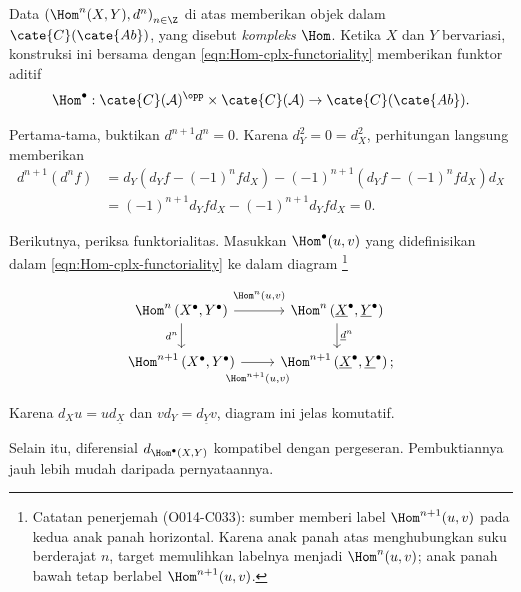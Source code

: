\begin{definisiproposisi}
	Data $\left(\Hom^n(X,Y),d^n\right)_{n\in\Z}$ di atas memberikan objek
	dalam $\cate{C}(\cate{Ab})$, yang disebut \emph{kompleks $\Hom$}. Ketika
	$X$ dan $Y$ bervariasi, konstruksi ini bersama
	dengan \eqref{eqn:Hom-cplx-functoriality} memberikan funktor aditif
	\[ \Hom^\bullet: \cate{C}(\mathcal{A})^{\opp} \times \cate{C}(\mathcal{A}) \to \cate{C}(\cate{Ab}). \]
\end{definisiproposisi}
\begin{bukti}
	Pertama-tama, buktikan $d^{n+1}d^n=0$. Karena
	$d_Y^2=0=d_X^2$, perhitungan langsung memberikan
	\begin{align*}
		d^{n+1} \left( d^n f \right) & = d_Y \left( d_Y f - (-1)^n f d_X \right) - (-1)^{n+1} \left( d_Y f - (-1)^n f d_X \right) d_X \\
		& = (-1)^{n+1} d_Y f d_X - (-1)^{n+1} d_Y f d_X = 0.
	\end{align*}

	Berikutnya, periksa funktorialitas. Masukkan $\Hom^\bullet(u,v)$ yang
	didefinisikan dalam \eqref{eqn:Hom-cplx-functoriality} ke dalam diagram%
	\footnote{Catatan penerjemah (O014-C033): sumber memberi label
	$\Hom^{n+1}(u,v)$ pada kedua anak panah horizontal. Karena anak panah atas
	menghubungkan suku berderajat $n$, target memulihkan labelnya menjadi
	$\Hom^n(u,v)$; anak panah bawah tetap berlabel $\Hom^{n+1}(u,v)$.}
	\[\begin{tikzcd}
		\Hom^n\left( X^\bullet, Y^\bullet \right) \arrow[d, "{d^n}"'] \arrow[r, "{\Hom^n(u, v)}" inner sep=0.7em] & \Hom^n\left( \underline{X}^\bullet, \underline{Y}^\bullet \right) \arrow[d, "{\underline{d}^n}"] \\
		\Hom^{n+1}\left( X^\bullet, Y^\bullet \right) \arrow[r, "{\Hom^{n+1}(u, v)}"' inner sep=0.7em] & \Hom^{n+1}\left( \underline{X}^\bullet, \underline{Y}^\bullet \right) ;
	\end{tikzcd}\]
	Karena $d_Xu=ud_{\underline{X}}$ dan $vd_Y=d_{\underline{Y}}v$, diagram
	ini jelas komutatif.
\end{bukti}

Selain itu, diferensial $d_{\Hom^\bullet(X,Y)}$ kompatibel dengan pergeseran.
Pembuktiannya jauh lebih mudah daripada pernyataannya.


